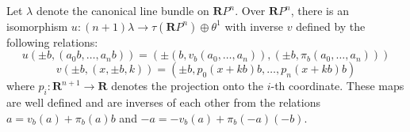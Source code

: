 Let $\lambda$ denote the canonical line bundle on $\mathbf{R}P^n$. Over $\mathbf{R}P^n$, there is an isomorphism $u \colon (n+1)\lambda \rightarrow \tau(\mathbf{R}P^n) \oplus \theta^1$ with inverse $v$ defined by the following relations:
$$u(\pm b, (a_0 b, \ldots, a_n b)) = (\pm(b, v_b(a_0, \ldots, a_n)), (\pm b, \pi_b(a_0, \ldots, a_n)))$$
$$v(\pm b, (x, \pm b, k)) = (\pm b, p_0(x + k b) b, \ldots, p_n(x + k b) b)$$
where $p_i \colon \mathbf{R}^{n+1} \rightarrow \mathbf{R}$ denotes the projection onto the $i$-th coordinate. These maps are well defined and are inverses of each other from the relations $a = v_b(a) + \pi_b(a) b$ and $-a = -v_b(a) + \pi_b(-a)(-b)$.
